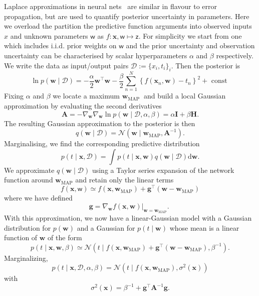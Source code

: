 \documentclass{article}
\newcommand{\vv}[1]{\boldsymbol{#1}}
\newcommand{\rv}[1]{\mathsf{#1}}
\newcommand{\vrv}[1]{\vv{\rv{#1}}}
\begin{document}
Laplace approximations in neural nets~\cite{MacKayPractical1992} are similar in flavour to error propagation, but are used to quantify posterior uncertainty in parameters.
Here we overload the partition the predictive function arguments into observed inputs \(x\) and unknown parameters \(\vrv{w}\) as \(f:\vv{x},\vrv{w}\mapsto \vrv{z}\).
For simplicity we start from one which includes i.i.d. prior weights on \(\vrv{w}\)
and the prior uncertainty and observation uncertainty can be characterised by scalar hyperparameters \(\alpha\) and \(\beta\) respectively.
We write the data as input/output pairs \(\mathcal{D}:=\{x_i,t_i\}_i\).
Then the posterior is~\cite[5.167]{BishopPattern2006}
\[
\ln p(\vv{w} \mid \mathcal{D})=-\frac{\alpha}{2} \vv{w}^{\top} \vv{w}-\frac{\beta}{2} \sum_{n=1}^{N}\left\{f\left(\vv{x}_{n}, \vv{w}\right)-t_{n}\right\}^{2}+\text { const }
\]
Fixing \(\alpha\) and \(\beta\) we locate a maximum \(\vv{w}_{\text {MAP }}\) and build a local Gaussian approximation by evaluating the second derivatives
\[
\mathbf{A}=-\nabla_{\vv{w}} \nabla_{\vv{w}} \ln p(\vv{w} \mid \mathcal{D}, \alpha, \beta)=\alpha \mathbf{I}+\beta \mathbf{H}.
\]
The resulting Gaussian approximation to the posterior is then
\[
q(\vv{w} \mid \mathcal{D})=\mathcal{N}\left(\vv{w} \mid \vv{w}_{\mathrm{MAP}}, \mathbf{A}^{-1}\right) .
\]
Marginalising, we find the corresponding predictive distribution
\[
p(t \mid \vv{x}, \mathcal{D})=\int p(t \mid \vv{x}, \vv{w}) q(\vv{w} \mid \mathcal{D}) \mathrm{d} \vv{w} .
\]
We approximate \(q(\vv{w} \mid \mathcal{D})\) using a Taylor series expansion of the network function around \(\vv{w}_{\mathrm{MAP}}\) and retain only the linear terms\[
f(\vv{x}, \vrv{w}) \simeq f\left(\vv{x}, \vv{w}_{\mathrm{MAP}}\right)+\vv{g}^{\top}\left(\vv{w}-\vv{w}_{\mathrm{MAP}}\right)
\]
where we have defined
\[
\vv{g}=\left.\nabla_{\vv{w}} f(\vv{x}, \vv{w})\right|_{\vv{w}=\vv{w}_{\mathrm{MAP}}} \text {. }
\]
With this approximation, we now have a linear-Gaussian model with a Gaussian distribution for \(p(\vv{w})\) and a Gaussian for \(p(t \mid \vv{w})\) whose mean is a linear function of \(\vv{w}\) of the form
\[
p(t \mid \vv{x}, \vv{w}, \beta) \simeq \mathcal{N}\left(t \mid f\left(\vv{x}, \vv{w}_{\mathrm{MAP}}\right)+\vv{g}^{\top}\left(\vv{w}-\vv{w}_{\mathrm{MAP}}\right), \beta^{-1}\right) .
\]
Marginalizing,
\[
p(t \mid \vv{x}, \mathcal{D}, \alpha, \beta)=\mathcal{N}\left(t \mid f\left(\vv{x}, \vv{w}_{\mathrm{MAP}}\right), \sigma^{2}(\vv{x})\right)
\]
with
\[
\sigma^{2}(\mathbf{x})=\beta^{-1}+\vv{g}^{\top} \mathbf{A}^{-1} \vv{g}.
\]
\end{document}
